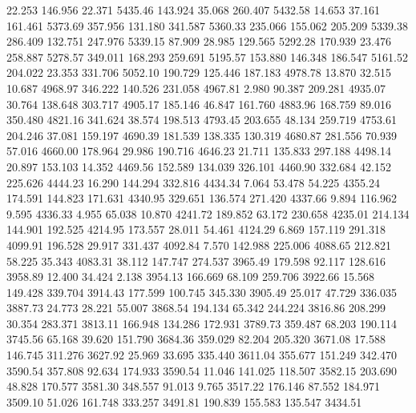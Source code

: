   22.253  146.956   22.371      5435.46
 143.924   35.068  260.407      5432.58
  14.653   37.161  161.461      5373.69
 357.956  131.180  341.587      5360.33
 235.066  155.062  205.209      5339.38
 286.409  132.751  247.976      5339.15
  87.909   28.985  129.565      5292.28
 170.939   23.476  258.887      5278.57
 349.011  168.293  259.691      5195.57
 153.880  146.348  186.547      5161.52
 204.022   23.353  331.706      5052.10
 190.729  125.446  187.183      4978.78
  13.870   32.515   10.687      4968.97
 346.222  140.526  231.058      4967.81
   2.980   90.387  209.281      4935.07
  30.764  138.648  303.717      4905.17
 185.146   46.847  161.760      4883.96
 168.759   89.016  350.480      4821.16
 341.624   38.574  198.513      4793.45
 203.655   48.134  259.719      4753.61
 204.246   37.081  159.197      4690.39
 181.539  138.335  130.319      4680.87
 281.556   70.939   57.016      4660.00
 178.964   29.986  190.716      4646.23
  21.711  135.833  297.188      4498.14
  20.897  153.103   14.352      4469.56
 152.589  134.039  326.101      4460.90
 332.684   42.152  225.626      4444.23
  16.290  144.294  332.816      4434.34
   7.064   53.478   54.225      4355.24
 174.591  144.823  171.631      4340.95
 329.651  136.574  271.420      4337.66
   9.894  116.962    9.595      4336.33
   4.955   65.038   10.870      4241.72
 189.852   63.172  230.658      4235.01
 214.134  144.901  192.525      4214.95
 173.557   28.011   54.461      4124.29
   6.869  157.119  291.318      4099.91
 196.528   29.917  331.437      4092.84
   7.570  142.988  225.006      4088.65
 212.821   58.225   35.343      4083.31
  38.112  147.747  274.537      3965.49
 179.598   92.117  128.616      3958.89
  12.400   34.424    2.138      3954.13
 166.669   68.109  259.706      3922.66
  15.568  149.428  339.704      3914.43
 177.599  100.745  345.330      3905.49
  25.017   47.729  336.035      3887.73
  24.773   28.221   55.007      3868.54
 194.134   65.342  244.224      3816.86
 208.299   30.354  283.371      3813.11
 166.948  134.286  172.931      3789.73
 359.487   68.203  190.114      3745.56
  65.168   39.620  151.790      3684.36
 359.029   82.204  205.320      3671.08
  17.588  146.745  311.276      3627.92
  25.969   33.695  335.440      3611.04
 355.677  151.249  342.470      3590.54
 357.808   92.634  174.933      3590.54
  11.046  141.025  118.507      3582.15
 203.690   48.828  170.577      3581.30
 348.557   91.013    9.765      3517.22
 176.146   87.552  184.971      3509.10
  51.026  161.748  333.257      3491.81
 190.839  155.583  135.547      3434.51
